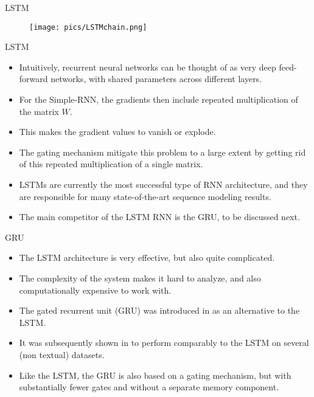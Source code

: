\documentclass[handout]{beamer}
\begin{document}
\begin{frame}{LSTM}
  \begin{figure}[h]
        	\texttt{[image: pics/LSTMchain.png]}
        \end{figure}
\end{frame}


\begin{frame}{LSTM}
\begin{scriptsize}

\begin{itemize}
\item Intuitively, recurrent neural networks can be thought of as very deep feed-forward networks, with shared parameters across different layers.
\item For the Simple-RNN, the gradients then include repeated multiplication of the matrix $W$.
\item This makes the gradient values to vanish or explode.
\item The gating mechanism mitigate this problem to a large extent by getting rid of this repeated multiplication of a single matrix.
\item LSTMs are currently the most successful type of RNN architecture, and they are responsible for many state-of-the-art sequence modeling results.
\item The main competitor of the LSTM RNN is the GRU, to be discussed next.
\end{itemize}
\end{scriptsize}
\end{frame}



\begin{frame}{GRU}
\begin{scriptsize}

\begin{itemize}
\item The LSTM architecture is very effective, but also quite complicated.
\item The complexity of the system makes it hard to analyze, and also computationally expensive to work with.
\item The gated recurrent unit (GRU) was introduced in \cite{cho2014learning} as an alternative to the LSTM.
\item It was subsequently shown in \cite{chung2014empirical} to perform comparably to the LSTM on several (non textual) datasets.
\item Like the LSTM, the GRU is also based on a gating mechanism, but with substantially fewer gates and without a separate memory component.
\end{itemize}
\end{scriptsize}
\end{frame}
\end{document}
